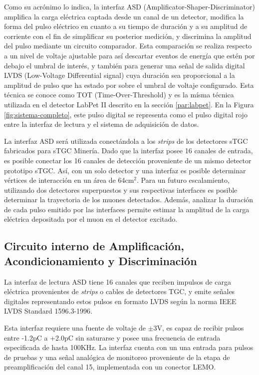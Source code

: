 Como su acrónimo lo indica, la interfaz ASD (Amplificator-Shaper-Discriminator) amplifica la carga eléctrica captada desde un canal de un detector, modifica la forma del pulso eléctrico en cuanto a su tiempo de duración y a su amplitud de corriente con el fin de simplificar su posterior medición, y discrimina la amplitud del pulso mediante un circuito comparador. Esta comparación se realiza respecto a un nivel de voltaje ajustable para así descartar eventos de energía que estén por debajo el umbral de interés, y también para generar una señal de salida digital LVDS (Low-Voltage Differential signal)\cite{1996IEEESociety} cuya duración sea proporcional a la amplitud de pulso que ha estado por sobre el umbral de voltaje configurado. Esta técnica se conoce como TOT (Time-Over-Threshold) y es la mísma técnica utilizada en el detector LabPet II descrito en la sección \ref{par:labpet}.  En la Figura \ref{fig:sistema-completo}, este pulso digital se representa como el pulso digital rojo entre la interfaz de lectura y el sistema de adquisición de datos.
        
La interfaz ASD será utilizada conectándola a los \textit{strips} de los detectores sTGC fabricados para sTGC Minería. Dado que la interfaz posee 16 canales de entrada, es posible conectar los 16 canales de detección proveniente de un mismo detector prototipo sTGC. Así, con un solo detector y una interfaz es posible determinar vértices de interacción en un área de 64cm$^2$. Para un futuro escalamiento, utilizando dos detectores superpuestos y sus respectivas interfaces es posible determinar la trayectoria de los muones detectados. Además, analizar la duración de cada pulso emitido por las interfaces permite estimar la amplitud de la carga eléctrica depositada por el muon en el detector excitado.


\subsection{Circuito interno de Amplificación, Acondicionamiento y Discriminación}
La interfaz de lectura ASD tiene 16 canales que reciben impulsos de carga eléctrica provenientes de \textit{strips} o cables de detectores TGC, y emite señales digitales representando estos pulsos en formato LVDS según la norma IEEE LVDS Standard 1596.3-1996\cite{1996IEEESociety}.

Esta interfaz requiere una fuente de voltaje de $\pm$3V\cite{1999ATLASICs}, es capaz de recibir pulsos entre -1.2pC a +2.0pC sin saturarse y posee una frecuencia de entrada especificada de hasta 100KHz. La interfaz cuenta con un una entrada para pulsos de pruebas y una señal analógica de monitoreo proveniente de la etapa de preamplificación del canal 15, implementada con un conector LEMO.


